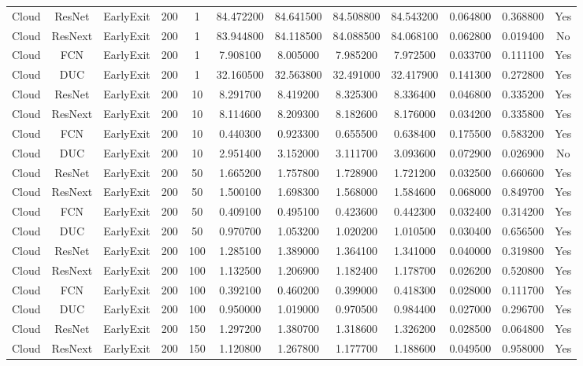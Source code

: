\begin{tabular}{|c||c||c||c||c||c||c||c||c||c||c||c|}
Cloud & ResNet & EarlyExit & 200 & 1 & 84.472200 & 84.641500 & 84.508800 & 84.543200 & 0.064800 & 0.368800 & Yes \\
Cloud & ResNext & EarlyExit & 200 & 1 & 83.944800 & 84.118500 & 84.088500 & 84.068100 & 0.062800 & 0.019400 & No \\
Cloud & FCN & EarlyExit & 200 & 1 & 7.908100 & 8.005000 & 7.985200 & 7.972500 & 0.033700 & 0.111100 & Yes \\
Cloud & DUC & EarlyExit & 200 & 1 & 32.160500 & 32.563800 & 32.491000 & 32.417900 & 0.141300 & 0.272800 & Yes \\
Cloud & ResNet & EarlyExit & 200 & 10 & 8.291700 & 8.419200 & 8.325300 & 8.336400 & 0.046800 & 0.335200 & Yes \\
Cloud & ResNext & EarlyExit & 200 & 10 & 8.114600 & 8.209300 & 8.182600 & 8.176000 & 0.034200 & 0.335800 & Yes \\
Cloud & FCN & EarlyExit & 200 & 10 & 0.440300 & 0.923300 & 0.655500 & 0.638400 & 0.175500 & 0.583200 & Yes \\
Cloud & DUC & EarlyExit & 200 & 10 & 2.951400 & 3.152000 & 3.111700 & 3.093600 & 0.072900 & 0.026900 & No \\
Cloud & ResNet & EarlyExit & 200 & 50 & 1.665200 & 1.757800 & 1.728900 & 1.721200 & 0.032500 & 0.660600 & Yes \\
Cloud & ResNext & EarlyExit & 200 & 50 & 1.500100 & 1.698300 & 1.568000 & 1.584600 & 0.068000 & 0.849700 & Yes \\
Cloud & FCN & EarlyExit & 200 & 50 & 0.409100 & 0.495100 & 0.423600 & 0.442300 & 0.032400 & 0.314200 & Yes \\
Cloud & DUC & EarlyExit & 200 & 50 & 0.970700 & 1.053200 & 1.020200 & 1.010500 & 0.030400 & 0.656500 & Yes \\
Cloud & ResNet & EarlyExit & 200 & 100 & 1.285100 & 1.389000 & 1.364100 & 1.341000 & 0.040000 & 0.319800 & Yes \\
Cloud & ResNext & EarlyExit & 200 & 100 & 1.132500 & 1.206900 & 1.182400 & 1.178700 & 0.026200 & 0.520800 & Yes \\
Cloud & FCN & EarlyExit & 200 & 100 & 0.392100 & 0.460200 & 0.399000 & 0.418300 & 0.028000 & 0.111700 & Yes \\
Cloud & DUC & EarlyExit & 200 & 100 & 0.950000 & 1.019000 & 0.970500 & 0.984400 & 0.027000 & 0.296700 & Yes \\
Cloud & ResNet & EarlyExit & 200 & 150 & 1.297200 & 1.380700 & 1.318600 & 1.326200 & 0.028500 & 0.064800 & Yes \\
Cloud & ResNext & EarlyExit & 200 & 150 & 1.120800 & 1.267800 & 1.177700 & 1.188600 & 0.049500 & 0.958000 & Yes \\

\end{tabular}

